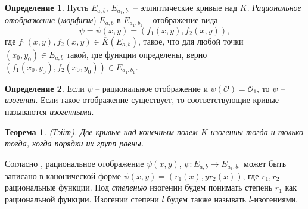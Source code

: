 \documentclass[a4paper,12pt]{article}
\newtheorem{theorem}{Теорема}
\theoremstyle{definition}
\newtheorem{definition}{Определение}
\begin{document}


\begin{definition}
Пусть $E_{a,b}$, $E_{a_1,b_1}$ -- эллиптические кривые над $K$. \emph{Рациональное отображение} (\emph{морфизм}) $E_{a,b}$ в $E_{a_1,b_1}$ -- отображение вида
$$
\psi=\psi(x,y)=(f_1(x,y),f_2(x,y)),
$$
где $f_1(x,y),f_2(x,y)\in\overline{K}(E_{a,b})$, такое, что для любой точки $(x_0,y_0)\in E_{a,b}$ такой, где функции определены,
верно $(f_1(x_0,y_0),f_2(x_0,y_0))\in E_{a_1,b_1}.$
\end{definition}


\begin{definition}
Если $\psi$ -- рациональное отображение и $\psi(\mathcal{O})=\mathcal{O}_1$, то $\psi$ -- \emph{изогения}.
Если такое отображение существует, то соответствующие кривые называются \emph{изогенными}.
\end{definition}

\begin{theorem} (Тэйт).
Две кривые над  конечным полем $K$ изогенны тогда и только тогда, когда порядки их групп равны.
\end{theorem}

Согласно \cite[2.9]{Wash}, рациональное отображение $\psi(x,y)$, $\psi:E_{a,b}\to E_{a_1,b_1}$ 
может быть записано в канонической форме $\psi(x,y)=(r_1(x),yr_2(x))$, где $r_1,r_2$ -- рациональные функции. Под \emph{степенью} изогении будем понимать степень $r_1$ как рациональной функции. Изогении степени $l$ будем также называть $l$-изогениями. 
\end{document}
